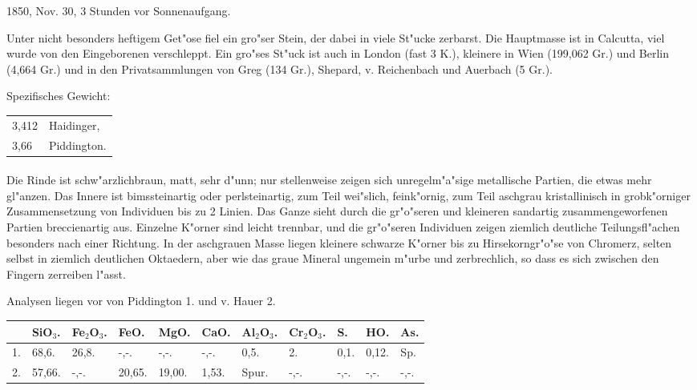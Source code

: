 \documentclass[a4paper, 11pt, oneside]{article}
\begin{document}
1850, Nov. 30, 3 Stunden vor Sonnenaufgang.

Unter nicht besonders heftigem Get"ose fiel ein gro"ser Stein, der dabei in viele St"ucke zerbarst. Die Hauptmasse ist in Calcutta, viel wurde von den Eingeborenen verschleppt. Ein gro"ses St"uck ist auch in London (fast 3 K.), kleinere in Wien (199,062 Gr.) und Berlin (4,664 Gr.) und in den Privatsammlungen von Greg (134 Gr.), Shepard, v. Reichenbach und Auerbach (5 Gr.).

Spezifisches Gewicht:  
\begin{table}[!ht]
    \centering
    \begin{tabular}{l l}
        3,412 & Haidinger,\\
        3,66 & Piddington.
    \end{tabular}
\end{table}
\paragraph{}
Die Rinde ist schw"arzlichbraun, matt, sehr d"unn; nur stellenweise zeigen sich unregelm"a"sige metallische Partien, die etwas mehr gl"anzen. Das Innere ist bimssteinartig oder perlsteinartig, zum Teil wei"slich, feink"ornig, zum Teil aschgrau kristallinisch in grobk"orniger Zusammensetzung von Individuen bis zu 2 Linien. Das Ganze sieht durch die gr"o"seren und kleineren sandartig zusammengeworfenen Partien breccienartig aus. Einzelne K"orner sind leicht trennbar, und die gr"o"seren Individuen zeigen ziemlich deutliche Teilungsfl"achen besonders nach einer Richtung. In der aschgrauen Masse liegen kleinere schwarze K"orner bis zu Hirsekorngr"o"se von Chromerz, selten selbst in ziemlich deutlichen Oktaedern, aber wie das graue Mineral ungemein m"urbe und zerbrechlich, so dass es sich zwischen den Fingern zerreiben l"asst.

Analysen liegen vor von Piddington 1. und v. Hauer 2.
\begin{table}[!ht]
    \centering
    \footnotesize
    \begin{tabular}{l l l l l l l l l l l}
         & SiO$_{3}$. & Fe$_{2}$O$_{3}$. & FeO. & MgO. & CaO. & Al$_{2}$O$_{3}$. & Cr$_{2}$O$_{3}$. & S. & HO. & As. \\ \hline
        1. & 68,6. & 26,8. & -,-. & -,-. & -,-. & 0,5. & 2. & 0,1. & 0,12. & Sp. \\
        2. & 57,66. & -,-. & 20,65. & 19,00. & 1,53. & Spur. & -,-. & -,-. & -,-. & -,-. \\
    \end{tabular}
\end{table}
\end{document}
